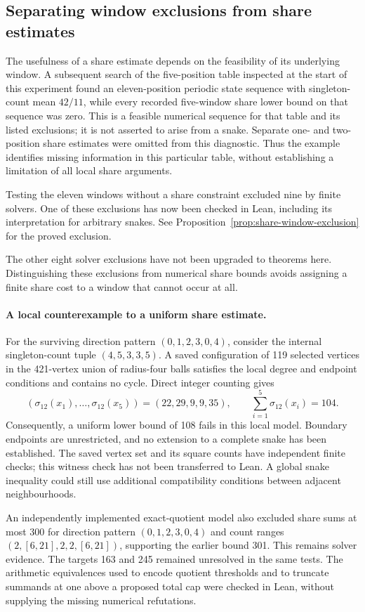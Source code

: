 \documentclass[11pt,a4paper]{article}
\theoremstyle{definition}
\theoremstyle{remark}
\begin{document}
\subsection{Separating window exclusions from share estimates}
The usefulness of a share estimate depends on the feasibility of its underlying window. A subsequent search of the five-position table inspected at the start of this experiment found an eleven-position periodic state sequence with singleton-count mean $42/11$, while every recorded five-window share lower bound on that sequence was zero. This is a feasible numerical sequence for that table and its listed exclusions; it is not asserted to arise from a snake. Separate one- and two-position share estimates were omitted from this diagnostic. Thus the example identifies missing information in this particular table, without establishing a limitation of all local share arguments.

Testing the eleven windows without a share constraint excluded nine by finite solvers. One of these exclusions has now been checked in Lean, including its interpretation for arbitrary snakes.
See Proposition~\ref{prop:share-window-exclusion} for the proved exclusion.


The other eight solver exclusions have not been upgraded to theorems here. Distinguishing these exclusions from numerical share bounds avoids assigning a finite share cost to a window that cannot occur at all.

\paragraph{A local counterexample to a uniform share estimate.}
For the surviving direction pattern $(0,1,2,3,0,4)$, consider the internal singleton-count tuple $(4,5,3,3,5)$. A saved configuration of 119 selected vertices in the 421-vertex union of radius-four balls satisfies the local degree and endpoint conditions and contains no cycle. Direct integer counting gives
\[
(\sigma_{12}(x_1),\ldots,\sigma_{12}(x_5))=(22,29,9,9,35),
\qquad \sum_{i=1}^{5}\sigma_{12}(x_i)=104.
\]
Consequently, a uniform lower bound of 108 fails in this local model. Boundary endpoints are unrestricted, and no extension to a complete snake has been established. The saved vertex set and its square counts have independent finite checks; this witness check has not been transferred to Lean. A global snake inequality could still use additional compatibility conditions between adjacent neighbourhoods.

An independently implemented exact-quotient model also excluded share sums at most 300 for direction pattern $(0,1,2,3,0,4)$ and count ranges $(2,[6,21],2,2,[6,21])$, supporting the earlier bound 301. This remains solver evidence. The targets 163 and 245 remained unresolved in the same tests. The arithmetic equivalences used to encode quotient thresholds and to truncate summands at one above a proposed total cap were checked in Lean, without supplying the missing numerical refutations.
\end{document}
